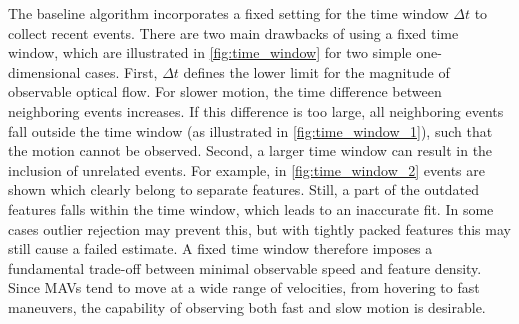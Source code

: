 The baseline algorithm incorporates a fixed setting for the time window $\Delta t$ to collect recent events. There are two main drawbacks of using a fixed time window, which are illustrated in \cref{fig:time_window} for two simple one-dimensional cases. First, $\Delta t$ defines the lower limit for the magnitude of observable optical flow. For slower motion, the time difference between neighboring events increases. If this difference is too large, all neighboring events fall outside the time window (as illustrated in \cref{fig:time_window_1}), such that the motion cannot be observed. Second, a larger time window can result in the inclusion of unrelated events. For example, in \cref{fig:time_window_2} events are shown which clearly belong to separate features. Still, a part of the outdated features falls within the time window, which leads to an inaccurate fit. In some cases outlier rejection may prevent this, but with tightly packed features this may still cause a failed estimate. A fixed time window therefore imposes a fundamental trade-off between minimal observable speed and feature density. Since MAVs tend to move at a wide range of velocities, from hovering to fast maneuvers, the capability of observing both fast and slow motion is desirable.

